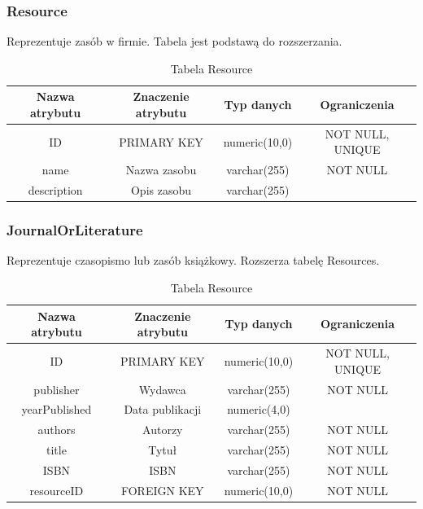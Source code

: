\subsubsection{Resource}
Reprezentuje zasób w firmie. Tabela jest podstawą do rozszerzania.
\begin{table}[H]
	\renewcommand\arraystretch{1.5}
	\renewcommand\tabcolsep{3pt}
	\begin{tabular}{| c | c | c | c |} 
		\hline \textbf{Nazwa atrybutu} & \textbf{Znaczenie atrybutu} & \textbf{Typ danych} & \textbf{Ograniczenia} \\ 
		\hline ID & PRIMARY KEY & numeric(10,0) & NOT NULL, UNIQUE \\ 
		\hline name & Nazwa zasobu & varchar(255) & NOT NULL  \\
		\hline description & Opis zasobu & varchar(255) & \\ 
		\hline 
	\end{tabular} 
	\caption{Tabela Resource}
	\label{TAB:Resource}
\end{table}

\subsubsection{JournalOrLiterature}
Reprezentuje czasopismo lub zasób książkowy. Rozszerza tabelę Resources.
\begin{table}[H]
	\renewcommand\arraystretch{1.5}
	\renewcommand\tabcolsep{3pt}
	\begin{tabular}{| c | c | c | c |} 
		\hline \textbf{Nazwa atrybutu} & \textbf{Znaczenie atrybutu} & \textbf{Typ danych} & \textbf{Ograniczenia} \\ 
		\hline ID & PRIMARY KEY & numeric(10,0) & NOT NULL, UNIQUE \\ 
		\hline publisher & Wydawca & varchar(255) & NOT NULL \\ 
		\hline yearPublished & Data publikacji & numeric(4,0) & \\
		\hline authors & Autorzy & varchar(255) & NOT NULL \\
		\hline title & Tytuł & varchar(255) & NOT NULL \\ 
		\hline ISBN & ISBN & varchar(255) & NOT NULL \\ 
		\hline resourceID & FOREIGN KEY & numeric(10,0) & NOT NULL \\ 
		\hline 
	\end{tabular} 
	\caption{Tabela Resource}
	\label{TAB:Resource}
\end{table}

